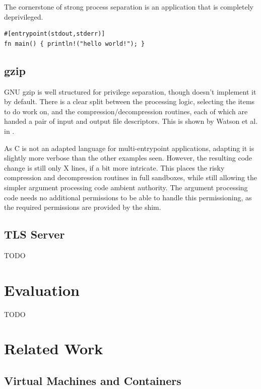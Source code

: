 \documentclass[sigplan]{acmart}
\begin{document}
The cornerstone of strong process separation is an application that is completely deprivileged.

\begin{lstlisting}[float]
#[entrypoint(stdout,stderr)]
fn main() { println!("hello world!"); }
\end{lstlisting}

\subsection{gzip}

GNU gzip \citep{gailly_gzip_2020} is well structured for privilege separation, though doesn't implement it by default. There is a clear split between the processing logic, selecting the items to do work on, and the compression/decompression routines, each of which are handed a pair of input and output file descriptors. This is shown by Watson et al. in \cite{watson_capsicum_2010}.

As C is not an adapted language for multi-entrypoint applications, adapting it is slightly more verbose than the other examples seen. However, the resulting code change is still only X lines, if a bit more intricate. This places the risky compression and decompression routines in full sandboxes, while still allowing the simpler argument processing code ambient authority. The argument processing code needs no additional permissions to be able to handle this permissioning, as the required permissions are provided by the shim.

\subsection{TLS Server}

TODO

\section{Evaluation}

TODO

\section{Related Work}

\subsection{Virtual Machines and Containers}
\end{document}
